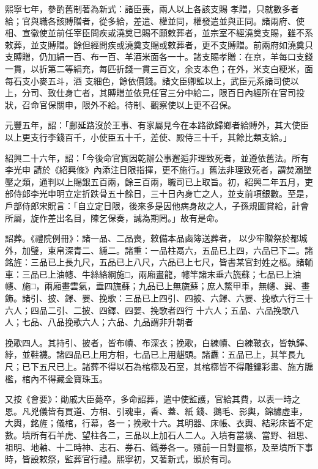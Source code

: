 \begin{pinyinscope}
 熙寧七年，參酌舊制著為新式：諸臣喪，兩人以上各該支賜
 孝贈，只就數多者給；官與職各該賻贈者，從多給，差遣、權並同，權發遣並與正同。諸兩府、使相、宣徽使並前任宰臣問疾或澆奠已賜不願敕葬者，並宗室不經澆奠支賜，雖不系敕葬，並支賻贈。餘但經問疾或澆奠支賜或敕葬者，更不支賻贈。前兩府如澆奠只支賻贈，仍加絹一百、布一百、羊酒米面各一十。諸支賜孝贈：在京，羊每口支錢一貫，以折第二等絹充，每匹折錢一貫三百文，余支本色；在外，米支白粳米，面每石支小麥五斗，酒
 支細色，餘依價錢。諸文臣卿監以上，武臣元系諸司使以上，分司、致仕身亡者，其賻贈並依見任官三分中給二，限百日內經所在官司投狀，召命官保關申，限外不給。待制、觀察使以上更不召保。



 元豐五年，詔：「鄜延路沒於王事、有家屬見今在本路欲歸鄉者給賻外，其大使臣以上更支行李錢百千，小使臣五十千，差使、殿侍三十千，其餘比類支給。」



 紹興二十六年，詔：「今後命官實因乾辦公事邂逅非理致死者，並遵依舊法。所有李光申
 請於《紹興條》內添注日限指揮，更不施行。」舊法非理致死者，謂焚溺墜壓之類，通判以上賜銀五百兩，餘三百兩，職司已上取旨。初，紹興二年五月，吏部侍郎李光申明立定折跌骨五十餘日，三十日內身亡之人，並支前項銀數。至是，戶部侍郎宋貺言：「自立定日限，後來多是因他病身故之人，子孫規圖賞給，計會所屬，旋作差出名目，陳乞保奏，誠為期罔。」故有是命。



 詔葬。《禮院例冊》：諸一品、二品喪，敕備本品鹵簿送葬者，
 以少牢贈祭於都城外，加璧，束帛深青二、纁二。諸重：一品柱鬲六，五品已上四，六品已下二。諸銘旌：三品已上長九尺，五品已上八尺，六品已上七尺，皆書某官封姓之柩。諸輀車：三品已上油幰、牛絲絡綱施□，兩廂畫龍，幰竿諸末垂六旒蘇；七品已上油幰、施□，兩廂畫雲氣，垂四旒蘇；九品已上無旒蘇；庶人鱉甲車，無幰、巽、畫飾。諸引、披、鐸、翣、挽歌：三品已上四引、四披、六鐸、六翣、挽歌六行三十六人；四品二引、二披、四鐸、四翣、挽歌者四行
 十六人；五品、六品挽歌八人；七品、八品挽歌六人；六品、九品謂非升朝者



 挽歌四人。其持引、披者，皆布幘、布深衣；挽歌，白練幘、白練鞁衣，皆執鐸、綍，並鞋襪。諸四品已上用方相，七品已上用魌頭。諸纛：五品已上，其竿長九尺；已下五尺已上。諸葬不得以石為棺槨及石室，其棺槨皆不得雕鏤彩畫、施方牖檻，棺內不得藏金寶珠玉。



 又按《會要》：勛戚大臣薨卒，多命詔葬，遣中使監護，官給其費，以表一時之恩。凡兇儀皆有買道、方相、引魂車，香、蓋、紙
 錢、鵝毛、影輿，錦繡虛車，大輿，銘旌；儀棺，行幕，各一；挽歌十六。其明器、床帳、衣輿、結彩床皆不定數。墳所有石羊虎、望柱各二，三品以上加石人二人。入墳有當壙、當野、祖思、祖明、地軸、十二時神、志石、券石、鐵券各一。殯前一日對靈柩，及至墳所下事時，皆設敕祭，監葬官行禮。熙寧初，又著新式，頒於有司。




\end{pinyinscope}
